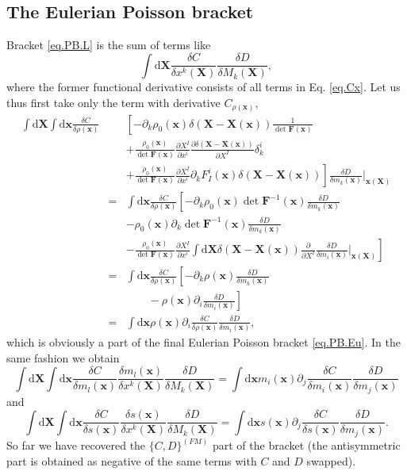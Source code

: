 \documentclass[
10pt, %
a4paper, %
oneside, %
headinclude,footinclude, %
BCOR5mm, %
]{scrartcl}
\newcommand{\xx}{\mathbf{x}}
\newcommand{\XX}{\mathbf{X}}
\newcommand{\dX}{\mathrm{d}\XX}
\newcommand{\dx}{\mathrm{d}\xx}
\newcommand{\FF}{\mathbf{F}}
\begin{document}
\subsection{The Eulerian Poisson bracket}
Bracket \eqref{eq.PB.L} is the sum of terms like
\begin{equation}
	\int\dX \frac{\delta C}{\delta x^k(\XX)} \frac{\delta D}{\delta M_k(\XX)},
\end{equation}
where the former functional derivative consists of all terms in Eq. \eqref{eq.Cx}. Let us thus first take only the term with derivative $C_{\rho(\xx)}$,
\begin{eqnarray}
	\int\dX \int\dx \frac{\delta C}{\delta \rho(\xx)}&&
	\left[
		-\partial_k \rho_0(\xx) \delta(\XX-\XX(\xx))\frac{1}{\det\FF(\xx)}\right.\nonumber\\
	&&
	+\frac{\rho_0(\xx)}{\det \FF(\xx)} \frac{\partial X^I}{\partial x^i} \frac{\partial \delta(\XX-\XX(\xx))}{\partial X^I}\delta^i_k \nonumber\\
	&&\left.+\frac{\rho_0(\xx)}{\det \FF(\xx)} \frac{\partial X^I}{\partial x^i} \partial_k F^i_I(\xx)\delta(\XX-\XX(\xx))\right]
\frac{\delta D}{\delta m_k(\xx)}\Big|_{\xx(\XX)}\nonumber\\
	&=& \int\dx \frac{\delta C}{\delta \rho(\xx)}\left[
		-\partial_k \rho_0(\xx)\det\FF^{-1}(\xx)\frac{\delta D}{\delta m_k(\xx)} \right.\nonumber\\
		&&-\rho_0(\xx) \partial_k \det \FF^{-1}(\xx)\frac{\delta D}{\delta m_k(\xx)} \nonumber\\
		&&\left.-\frac{\rho_0(\xx)}{\det \FF(\xx)} \frac{\partial X^I}{\partial x^i} \int\dX \delta(\XX-\XX(\xx))\frac{\partial}{\partial X^I}\frac{\delta D}{\delta m_i(\xx)}\Big|_{\xx(\XX)}\right]\nonumber\\
	&=&\int\dx \frac{\delta C}{\delta \rho(\xx)}\left[-\partial_k \rho(\xx)\frac{\delta D}{\delta m_k(\xx)}\right.\nonumber\\
	&&\left.\qquad -\rho(\xx) \partial_i \frac{\delta D}{\delta m_i(\xx)}\right]\nonumber\\
	&=& \int\dx \rho(\xx)\partial_i \frac{\delta C}{\delta \rho(\xx)} \frac{\delta D}{\delta m_i(\xx)},
\end{eqnarray}
which is obviously a part of the final Eulerian Poisson bracket \eqref{eq.PB.Eu}. In the same fashion we obtain
\begin{equation}
	\int\dX \int\dx \frac{\delta C}{\delta m_l(\xx)} \frac{\delta m_l(\xx)}{\delta x^k(\XX)} \frac{\delta D}{\delta M_k(\XX)}
	= \int\dx m_i(\xx)\partial_j \frac{\delta C}{\delta m_i(\xx)} \frac{\delta D}{\delta m_j(\xx)}
\end{equation}
and
\begin{equation}
	\int\dX \int\dx \frac{\delta C}{\delta s(\xx)} \frac{\delta s(\xx)}{\delta x^k(\XX)} \frac{\delta D}{\delta M_k(\XX)}
	= \int\dx s(\xx)\partial_j \frac{\delta C}{\delta s(\xx)} \frac{\delta D}{\delta m_j(\xx)}.
\end{equation}
So far we have recovered the $\{C,D\}^{(FM)}$ part of the bracket (the antisymmetric part is obtained as negative of the same terms with $C$ and $D$ swapped).
\end{document}
